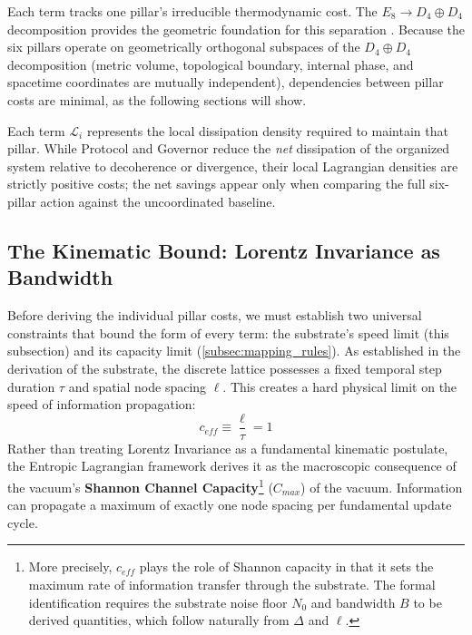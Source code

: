Each term tracks one pillar's irreducible thermodynamic cost. The $E_8 \to D_4 \oplus D_4$ decomposition provides the geometric foundation for this separation \cite{meyer_informational_2026}. Because the six pillars operate on geometrically orthogonal subspaces of the $D_4 \oplus D_4$ decomposition (metric volume, topological boundary, internal phase, and spacetime coordinates are mutually independent), dependencies between pillar costs are minimal, as the following sections will show.

Each term $\mathcal{L}_i$ represents the local dissipation density required to maintain that pillar. 
While Protocol and Governor reduce the \emph{net} dissipation of the organized system relative to decoherence or divergence, their local Lagrangian densities are strictly positive costs; the net savings appear only when comparing the full six-pillar action against the uncoordinated baseline.

\subsection{The Kinematic Bound: Lorentz Invariance as Bandwidth}
\label{subsec:kinetic_constraint}

Before deriving the individual pillar costs, we must establish two universal constraints that bound the form of every term: the substrate's speed limit (this subsection) and its capacity limit (\cref{subsec:mapping_rules}). As established in the derivation of the substrate, the discrete lattice possesses a fixed temporal step duration $\tau$ and spatial node spacing $\ell$. This creates a hard physical limit on the speed of information propagation:
\begin{equation}
c_{eff} \equiv \frac{\ell}{\tau} = 1
\end{equation}
Rather than treating Lorentz Invariance as a fundamental kinematic postulate, the Entropic Lagrangian framework derives it as the macroscopic consequence of the vacuum's \textbf{Shannon Channel Capacity}\footnote{More precisely, $c_{eff}$ plays the role of Shannon capacity in that it sets the maximum rate of information transfer through the substrate. The formal identification requires the substrate noise floor $N_0$ and bandwidth $B$ to be derived quantities, which follow naturally from $\Delta$ and $\ell$.} ($C_{max}$) of the vacuum. Information can propagate a maximum of exactly one node spacing per fundamental update cycle.

